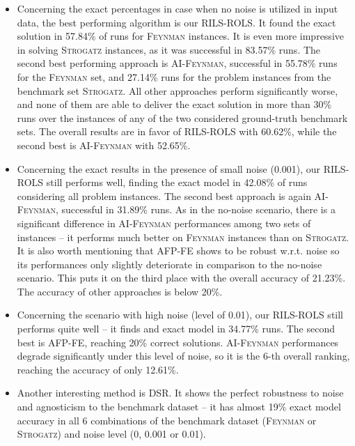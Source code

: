 \documentclass{bmcart}
\begin{document}
\begin{itemize}
	\item Concerning the exact percentages in case when no noise is utilized in input data, the best performing algorithm is our \textsc{RILS-ROLS}. It found the exact solution in 57.84\% of runs for \textsc{Feynman} instances. It is even more impressive in solving \textsc{Strogatz} instances, as it was successful in 83.57\% runs. The second best performing  approach is \textsc{AI-Feynman}, successful in 55.78\% runs for the \textsc{Feynman} set, and 27.14\% runs for the problem instances from the benchmark set \textsc{Strogatz}. All other approaches perform significantly worse, and none of them are able to deliver the exact solution in more than 30\% runs over the instances of any of the two considered ground-truth benchmark sets. The overall results are in favor of \textsc{RILS-ROLS} with 60.62\%, while the second best is \textsc{AI-Feynman} with 52.65\%. 
	\item  Concerning the exact results in the presence of small noise (0.001), our \textsc{RILS-ROLS} still performs well, finding the exact model in 42.08\% of runs considering all problem instances. The second best approach is again \textsc{AI-Feynman}, successful in 31.89\% runs. As in the no-noise scenario, there is a significant difference in \textsc{AI-Feynman} performances among two sets of instances -- it performs much better on \textsc{Feynman} instances than on \textsc{Strogatz}. It is also worth mentioning that \textsc{AFP-FE} shows to be robust w.r.t. noise so its performances only slightly deteriorate in comparison to the no-noise scenario. This puts it on the third place with the overall accuracy of 21.23\%. The accuracy of other approaches is below 20\%.  
	\item  Concerning the scenario with high noise (level of 0.01), our \textsc{RILS-ROLS} still performs quite well -- it finds and exact model in 34.77\% runs. The second best is \textsc{AFP-FE}, reaching 20\% correct solutions. \textsc{AI-Feynman} performances degrade significantly under this level of noise, so it is the 6-th overall ranking, reaching the accuracy of only 12.61\%. 
	
	\item Another interesting method is \textsc{DSR}. It shows the perfect robustness to noise and agnosticism to the benchmark dataset -- it has almost 19\% exact model accuracy in all 6 combinations of the benchmark dataset (\textsc{Feynman} or \textsc{Strogatz}) and noise level (0, 0.001 or 0.01).     
	

\end{itemize}
\end{document}
